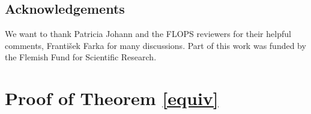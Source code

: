 \documentclass{llncs}
\begin{document}
\subsection*{Acknowledgements} We want to thank Patricia Johann and the FLOPS reviewers for their helpful 
comments, Franti\v sek Farka for many discussions. Part of this work was funded
by the Flemish Fund for Scientific Research.




\newpage
\appendix



\section{Proof of Theorem \ref{equiv}}\label{app:proof}
\end{document}
